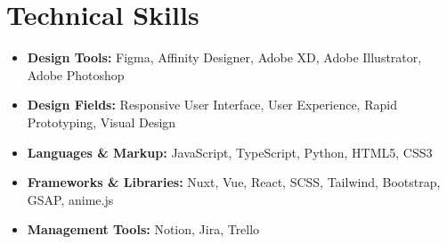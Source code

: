 \section*{Technical Skills}
%
%
%
\begin{itemize}
	\item \textbf{Design Tools:} Figma, Affinity Designer, Adobe XD, Adobe Illustrator, Adobe Photoshop
	\item \textbf{Design Fields:} Responsive User Interface, User Experience, Rapid Prototyping, Visual Design
	\item \textbf{Languages \& Markup:} JavaScript, TypeScript, Python, HTML5, CSS3
	\item \textbf{Frameworks \& Libraries:} Nuxt, Vue, React, SCSS, Tailwind, Bootstrap, GSAP, anime.js
	\item \textbf{Management Tools:} Notion, Jira, Trello
\end{itemize}
